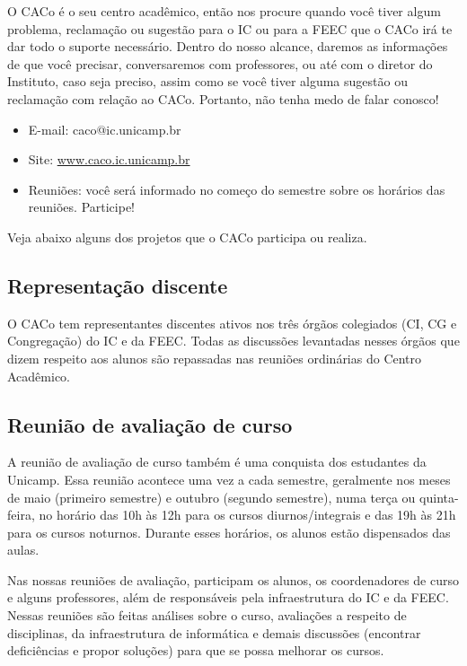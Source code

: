 O CACo é o seu centro acadêmico, então nos procure quando você tiver algum
problema, reclamação ou sugestão para o IC ou para a FEEC que o CACo irá te dar todo
o suporte necessário. Dentro do nosso alcance, daremos as informações de que você
precisar, conversaremos com professores, ou até com o diretor do Instituto,
caso seja preciso, assim como se você tiver alguma sugestão ou reclamação com
relação ao CACo. Portanto, não tenha medo de falar conosco!

\begin{itemize}
\item  E-mail: caco@ic.unicamp.br
\item  Site: \url{www.caco.ic.unicamp.br}
\item  Reuniões: você será informado no começo do semestre sobre os horários das reuniões. Participe!
\end{itemize}

Veja abaixo alguns dos projetos que o CACo participa ou realiza.

\subsection{Representação discente}

O CACo tem representantes discentes ativos nos três órgãos colegiados (CI, CG e
Congregação) do IC e da FEEC. Todas as discussões levantadas nesses órgãos que
dizem respeito aos alunos são repassadas nas reuniões ordinárias do Centro Acadêmico.

\subsection{Reunião de avaliação de curso}

A reunião de avaliação de curso também é uma conquista dos estudantes da
Unicamp. Essa reunião acontece uma vez a cada semestre, geralmente
nos meses de maio (primeiro semestre) e outubro (segundo semestre),
numa terça ou quinta-feira, no horário das 10h às 12h para os cursos
diurnos/integrais e das 19h às 21h para os cursos noturnos. Durante esses
horários, os alunos estão dispensados das aulas.

Nas nossas reuniões de avaliação, participam os alunos, os coordenadores de curso e alguns
professores, além de responsáveis pela infraestrutura do IC e da FEEC. Nessas
reuniões são feitas análises sobre o curso, avaliações a respeito de disciplinas,
da infraestrutura de informática e demais discussões (encontrar
deficiências e propor soluções) para que se possa melhorar os
cursos.

